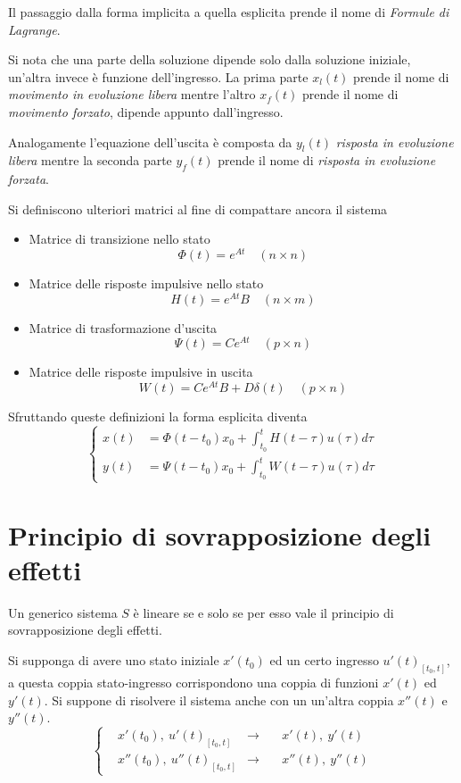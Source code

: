 Il passaggio dalla forma implicita a quella esplicita prende il nome di
\textit{Formule di Lagrange}.

Si nota che una parte della soluzione dipende solo dalla soluzione iniziale,
un'altra invece è funzione dell'ingresso.
La prima parte $x_l(t)$ prende il nome di \textit{movimento in evoluzione
libera} mentre l'altro $x_f(t)$ prende il nome di \textit{movimento forzato},
dipende appunto dall'ingresso.

Analogamente l'equazione dell'uscita è composta da $y_l(t)$ \textit{risposta in
evoluzione libera} mentre la seconda parte $y_f(t)$ prende il nome di
\textit{risposta in evoluzione forzata}.

Si definiscono ulteriori matrici al fine di compattare ancora il sistema
\begin{itemize}
\item Matrice di transizione nello stato
$$
\Phi(t) = e^{At}\quad (n\times n)
$$
\item Matrice delle risposte impulsive nello stato
$$
H(t) = e^{At}B \quad (n\times m)
$$
\item Matrice di trasformazione d'uscita
$$
\Psi(t) = Ce^{At} \quad (p\times n)
$$
\item Matrice delle risposte impulsive in uscita
$$
W(t) = Ce^{At}B + D\delta(t) \quad (p\times n)
$$
\end{itemize}
Sfruttando queste definizioni la forma esplicita diventa
$$\left\{\begin{aligned}
x(t) &= \Phi(t-t_0) x_0 + \int_{t_0}^t H(t-\tau)u(\tau)d\tau \\
y(t) &= \Psi(t-t_0) x_0 + \int_{t_0}^t W(t-\tau)u(\tau)d\tau
\end{aligned}\right.
$$

\newpage
\section{Principio di sovrapposizione degli effetti}
Un generico sistema $S$ è lineare se e solo se per esso vale il principio di
sovrapposizione degli effetti.

Si supponga di avere uno stato iniziale $x'(t_0)$ ed un certo ingresso
$u'(t)_{[t_0,t]}$, a questa coppia stato-ingresso corrispondono una coppia di
funzioni $x'(t)$ ed $y'(t)$.
Si suppone di risolvere il sistema anche con un un'altra coppia $x''(t)$ e
$y''(t)$.
$$\left\{\begin{aligned}
&x'(t_0),\ u'(t)_{[t_0,t]} &\longrightarrow\quad &x'(t),\ y'(t) \\
&x''(t_0),\ u''(t)_{[t_0,t]} &\longrightarrow\quad & x''(t),\ y''(t)
\end{aligned}\right.
$$

